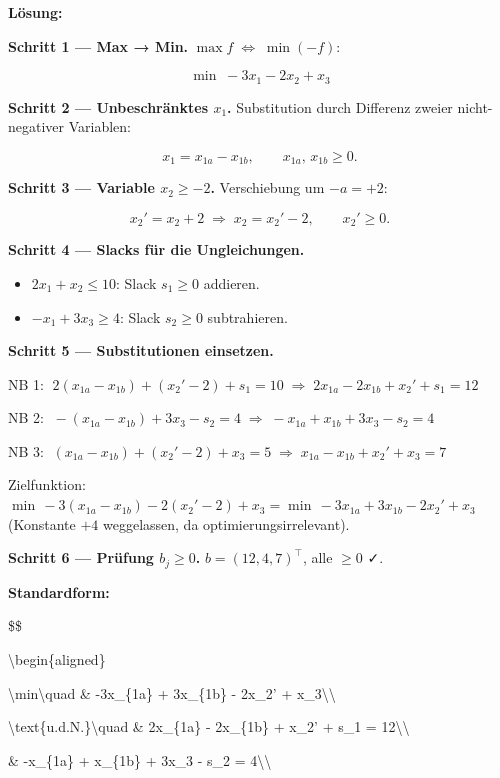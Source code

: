 \documentclass[11pt, a4paper]{article}
\begin{document}
\textbf{Lösung:}


\textbf{Schritt 1 — Max → Min.} $\max f \;\Leftrightarrow\; \min(-f)$:


\[
\min\;-3x_1 - 2x_2 + x_3
\]


\textbf{Schritt 2 — Unbeschränktes $x_1$.} Substitution durch Differenz zweier nicht-negativer Variablen:

\[
x_1 = x_{1a} - x_{1b}, \qquad x_{1a},\,x_{1b}\geq 0.
\]


\textbf{Schritt 3 — Variable $x_2 \geq -2$.} Verschiebung um $-a = +2$:

\[
x_2' = x_2 + 2 \;\Rightarrow\; x_2 = x_2' - 2,\qquad x_2' \geq 0.
\]


\textbf{Schritt 4 — Slacks für die Ungleichungen.}

\begin{itemize}
  \item $2x_1 + x_2 \leq 10$: Slack $s_1 \geq 0$ addieren.
  \item $-x_1 + 3x_3 \geq 4$: Slack $s_2 \geq 0$ subtrahieren.
\end{itemize}

\textbf{Schritt 5 — Substitutionen einsetzen.}


NB 1: $\;2(x_{1a}-x_{1b}) + (x_2' - 2) + s_1 = 10 \;\Rightarrow\; 2x_{1a} - 2x_{1b} + x_2' + s_1 = 12$


NB 2: $\;-(x_{1a}-x_{1b}) + 3x_3 - s_2 = 4 \;\Rightarrow\; -x_{1a} + x_{1b} + 3x_3 - s_2 = 4$


NB 3: $\;(x_{1a}-x_{1b}) + (x_2'-2) + x_3 = 5 \;\Rightarrow\; x_{1a} - x_{1b} + x_2' + x_3 = 7$


Zielfunktion: $\min\,-3(x_{1a}-x_{1b}) - 2(x_2'-2) + x_3 = \min\,-3x_{1a} + 3x_{1b} - 2x_2' + x_3$ (Konstante $+4$ weggelassen, da optimierungsirrelevant).


\textbf{Schritt 6 — Prüfung $b_j \geq 0$.} $b = (12, 4, 7)^\top$, alle $\geq 0$ ✓.


\textbf{Standardform:}


\$\$

\textbackslash{}begin\{aligned\}

\textbackslash{}min\textbackslash{}quad \& -3x\_\{1a\} + 3x\_\{1b\} - 2x\_2' + x\_3\textbackslash{}\textbackslash{}

\textbackslash{}text\{u.d.N.\}\textbackslash{}quad \& 2x\_\{1a\} - 2x\_\{1b\} + x\_2' + s\_1 = 12\textbackslash{}\textbackslash{}

\& -x\_\{1a\} + x\_\{1b\} + 3x\_3 - s\_2 = 4\textbackslash{}\textbackslash{}
\end{document}
